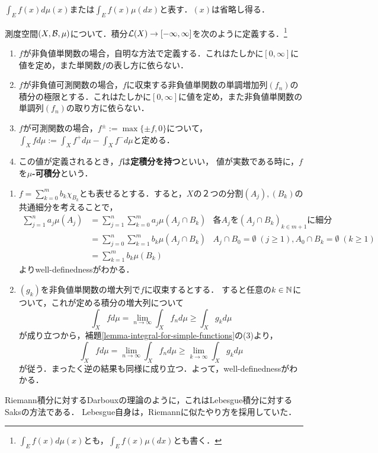 \documentclass[uplatex, dvipdfmx]{jsreport}
\begin{document}
\begin{notation}
    $\int_Ef(x)d\mu(x)$または$\int_Ef(x)\mu(dx)$と表す．$(x)$は省略し得る．
\end{notation}

\begin{definition}[integrable]
    測度空間$(X,\mathcal{B},\mu)$について．積分$\mathcal{L}(X)\to[-\infty,\infty]$を次のように定義する．\footnote{$\int_Ef(x)d\mu(x)$とも，$\int_Ef(x)\mu(dx)$とも書く．}
    \begin{enumerate}
        \item $f$が非負値単関数の場合，自明な方法で定義する．これはたしかに$[0,\infty]$に値を定め，また単関数$f$の表し方に依らない．
        \item $f$が非負値可測関数の場合，$f$に収束する非負値単関数の単調増加列$(f_n)$の積分の極限とする．これはたしかに$[0,\infty]$に値を定め，また非負値単関数の単調列$(f_n)$の取り方に依らない．
        \item $f$が可測関数の場合，$f^{\pm}:=\max\{\pm f,0\}$について，$\int_Xfd\mu:=\int_Xf^+d\mu-\int_Xf^-d\mu$と定める．
        \item この値が定義されるとき，$f$は\textbf{定積分を持つ}といい，
        値が実数である時に，$f$を\textbf{$\mu$-可積分}という．
    \end{enumerate}
\end{definition}
\begin{Proof}\mbox{}
    \begin{enumerate}
        \item $f=\sum^m_{k=0}b_k\chi_{B_k}$とも表せるとする．すると，$X$の２つの分割$(A_j),(B_k)$の共通細分を考えることで，
        \begin{align*}
            \sum^n_{j=1}a_j\mu(A_j)&=\sum^n_{j=1}\sum^m_{k=0}a_j\mu(A_j\cap B_k)&各A_jを(A_j\cap B_k)_{k\in m+1}に細分\\
            &=\sum^n_{j=0}\sum^m_{k=1}b_k\mu(A_j\cap B_k)&A_j\cap B_0=\emptyset\;(j\ge 1),A_0\cap B_k=\emptyset\;(k\ge 1)\\
            &=\sum^m_{k=1}b_k\mu(B_k)
        \end{align*}
        よりwell-definednessがわかる．
        \item $(g_k)$を非負値単関数の増大列で$f$に収束するとする．
        すると任意の$k\in\mathbb{N}$について，これが定める積分の増大列について
        \[\int_Xfd\mu=\lim_{n\to\infty}\int_Xf_nd\mu\ge\int_Xg_kd\mu\]
        が成り立つから，補題\ref{lemma-integral-for-simple-functions}の(3)より，
        \[\int_Xfd\mu=\lim_{n\to\infty}\int_Xf_nd\mu\ge\lim_{k\to\infty}\int_Xg_kd\mu\]
        が従う．まったく逆の結果も同様に成り立つ．よって，well-definednessがわかる．
    \end{enumerate}
\end{Proof}
\begin{history}
    Riemann積分に対するDarbouxの理論のように，これはLebesgue積分に対するSaksの方法である\cite{Saks}．
    Lebesgue自身は，Riemannに似たやり方を採用していた．
\end{history}
\end{document}
